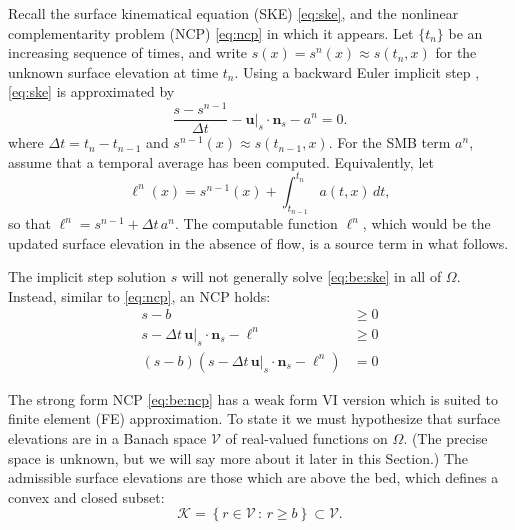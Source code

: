 \documentclass[hidelinks,onefignum,onetabnum,final]{siamart220329}  %
\newcommand{\bn}{\mathbf{n}}
\newcommand{\bu}{\mathbf{u}}
\newcommand{\cK}{\mathcal{K}}
\newcommand{\cV}{\mathcal{V}}
\begin{document}
Recall the surface kinematical equation (SKE) \eqref{eq:ske}, and the nonlinear complementarity problem (NCP) \eqref{eq:ncp} in which it appears.  Let $\{t_n\}$ be an increasing sequence of times, and write $s(x) = s^n(x)\approx s(t_n,x)$ for the unknown surface elevation at time $t_n$.  Using a backward Euler implicit step \cite{AscherPetzold1998}, \eqref{eq:ske} is approximated by
\begin{equation}
\frac{s - s^{n-1}}{\Delta t} - \bu|_s \cdot \bn_s - a^n = 0. \label{eq:be:ske}
\end{equation}
where $\Delta t = t_n-t_{n-1}$ and $s^{n-1}(x) \approx s(t_{n-1},x)$.  For the SMB term $a^n$, assume that a temporal average has been computed.  Equivalently, let
\begin{equation}
\ell^n(x) = s^{n-1}(x) + \int_{t_{n-1}}^{t_n} a(t,x)\,dt, \label{eq:be:source}
\end{equation}
so that $\ell^n=s^{n-1}+\Delta t\,a^n$.  The computable function $\ell^n$, which would be the updated surface elevation in the absence of flow, is a source term in what follows.

The implicit step solution $s$ will not generally solve \eqref{eq:be:ske} in all of $\Omega$.  Instead, similar to \eqref{eq:ncp}, an NCP holds:
\begin{subequations}
\label{eq:be:ncp}
\begin{align}
s - b &\ge 0 \label{eq:be:ncp:constraint} \\
s - \Delta t\,\bu|_s \cdot \bn_s - \ell^n &\ge 0 \\
(s - b) \left(s - \Delta t\,\bu|_s \cdot \bn_s - \ell^n\right) &= 0
\end{align}
\end{subequations}

The strong form NCP \eqref{eq:be:ncp} has a weak form VI version which is suited to finite element (FE) approximation.  To state it we must hypothesize that surface elevations are in a Banach space $\cV$ of real-valued functions on $\Omega$.  (The precise space is unknown, but we will say more about it later in this Section.)  The admissible surface elevations are those which are above the bed, which defines a convex and closed subset:
\begin{equation}
\cK = \left\{r \in\cV\,:\,r \ge b\right\} \subset \cV.  \label{eq:be:admissible}
\end{equation}
\end{document}
